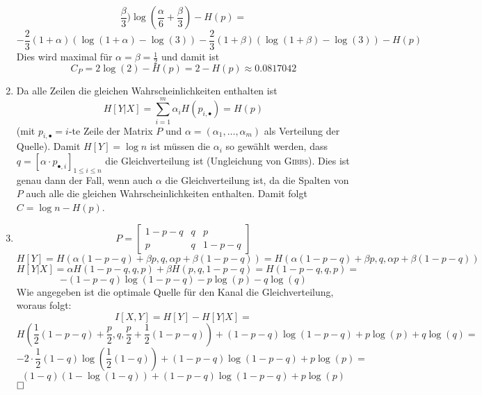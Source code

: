 \begin{enumerate}
\[	\frac{\beta}{3}) \log (\frac{\alpha}{6} + \frac{\beta}{3}) - H(p) = \]
	\[ -\frac{2}{3}(1 + \alpha)(\log(1+\alpha) - \log(3)) -\frac{2}{3}(1 +
	\beta)(\log(1+\beta) - \log(3)) - H(p) \]
	Dies wird maximal für $\alpha = \beta = \frac{1}{2}$ und damit ist
	\[C_{P} = 2\log(2) - H(p) = 2 - H(p) \approx 0.0817042 \]
\item
	Da alle Zeilen die gleichen Wahrscheinlichkeiten enthalten ist
	\[ H[Y|X] = \sum_{i=1}^{m} \alpha_{i} H(p_{i,\bullet}) = H(p) \]
	(mit $p_{i,\bullet} = i$-te Zeile der Matrix $P$ und $\alpha =
	(\alpha_{1}, \dots, \alpha_{m})$ als Verteilung der Quelle).
	Damit $H[Y] = \log n$ ist müssen die $\alpha_{i}$ so gewählt werden,
	dass $q = [\alpha \cdot p_{\bullet,i}]_{1\leq i\leq n}$ die
	Gleichverteilung ist (Ungleichung von \textsc{Gibbs}). Dies ist genau
	dann der Fall, wenn auch $\alpha$ die Gleichverteilung ist, da die
	Spalten von $P$ auch alle die gleichen Wahrscheinlichkeiten enthalten.
	Damit folgt $C = \log n - H(p)$.
\item
	\[ P=\begin{bmatrix}1-p-q&q&p\\p&q&1-p-q\end{bmatrix} \]	
	\[ H[Y] = H(\alpha(1-p-q)+\beta p, q, \alpha p + \beta(1-p-q)) =
	H(\alpha(1-p-q)+\beta p, q, \alpha p + \beta(1-p-q)) \]
	\[ H[Y|X] = \alpha H(1-p-q, q, p) + \beta H(p, q, 1-p-q) = H(1-p-q,q,p) =\]
	\[ -(1-p-q) \log(1-p-q) -p\log(p) -q\log(q) \]
	Wie angegeben ist die optimale Quelle für den Kanal die
	Gleichverteilung, woraus folgt:
	\[ I[X,Y] = H[Y] - H[Y|X] = \]
	\[ H(\frac{1}{2}(1-p-q)+\frac{p}{2}, q, \frac{p}{2} +
	\frac{1}{2}(1-p-q)) + (1-p-q) \log(1-p-q)  + p\log(p) + q\log(q) = \]
	\[ -2\cdot\frac{1}{2}(1-q)\log(\frac{1}{2}(1-q)) + (1-p-q) \log(1-p-q) + p\log(p) = \]
	\[ (1-q)(1-\log(1-q)) + (1-p-q) \log(1-p-q) + p\log(p) \]$\hfill \square$
\end{enumerate}
